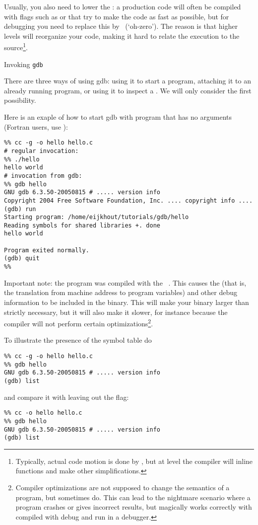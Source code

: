 Usually, you also need to lower
the : a production code
will often be compiled with flags such as  or  that
try to make the code as fast as possible, but for debugging you need
to replace this by~ (`oh-zero').  The reason is that higher
levels will reorganize your code, making it hard to relate the
execution to the source\footnote{Typically, actual code motion is done
by , but at level  the compiler will inline functions
and make other simplifications.}.

 {Invoking {\tt gdb}}

There are three ways of using gdb: using it to start a program,
attaching it to an already running program, or using it to inspect a
. We will only consider the first possibility.

Here is an exaple of how to start gdb with program that has no
arguments (Fortran users, use ):
\begin{verbatim}
%% cc -g -o hello hello.c
# regular invocation:
%% ./hello
hello world
# invocation from gdb:
%% gdb hello
GNU gdb 6.3.50-20050815 # ..... version info
Copyright 2004 Free Software Foundation, Inc. .... copyright info ....
(gdb) run
Starting program: /home/eijkhout/tutorials/gdb/hello 
Reading symbols for shared libraries +. done
hello world

Program exited normally.
(gdb) quit
%%
\end{verbatim}

Important note: the program was compiled with the ~. This causes the  (that is, the
translation from machine address to program variables) and other debug
information to be included in the binary. This will make your binary
larger than strictly necessary, but it will also make it slower, for
instance because the compiler will not perform certain
optimizations\footnote{Compiler optimizations are not supposed to
  change the semantics of a program, but sometimes do. This can lead
  to the nightmare scenario where a program crashes or gives incorrect
  results, but magically works correctly with compiled with debug and
  run in a debugger.}.

To illustrate the presence of the symbol table do
\begin{verbatim}
%% cc -g -o hello hello.c
%% gdb hello
GNU gdb 6.3.50-20050815 # ..... version info
(gdb) list
\end{verbatim}
and compare it with leaving out the  flag:
\begin{verbatim}
%% cc -o hello hello.c
%% gdb hello
GNU gdb 6.3.50-20050815 # ..... version info
(gdb) list
\end{verbatim}

